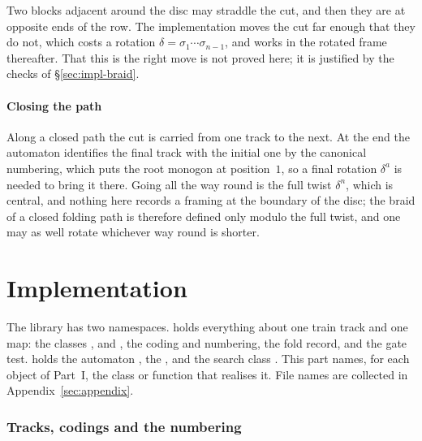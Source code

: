 \documentclass[12pt]{amsart}
\newcommand{\np}{n}                       %
\theoremstyle{plain}
\theoremstyle{definition}
\begin{document}
Two blocks adjacent around the disc may straddle the cut, and then they
are at opposite ends of the row.  The implementation moves the cut far
enough that they do not, which costs a rotation
$\delta = \sigma_1 \cdots \sigma_{\np-1}$, and works in the rotated frame
thereafter.  That this is the right move is not proved here; it is
justified by the checks of \S\ref{sec:impl-braid}.

\subsection{Closing the path}
Along a closed path the cut is carried from one track to the next.  At the
end the automaton identifies the final track with the initial one by the
canonical numbering, which puts the root monogon at position~$1$, so a
final rotation $\delta^a$ is needed to bring it there.  Going all the way
round is the full twist $\delta^{\np}$, which is central, and nothing here
records a framing at the boundary of the disc; the braid of a closed folding
path is therefore defined only modulo the full twist, and one may as well
rotate whichever way round is shorter.

\part{Implementation}

The library has two namespaces.   holds everything
about one train track and one map: the classes ,
 and , the coding and numbering, the fold
record, and the gate test.   holds the automaton
, the , and the search class
.  This part names, for each object of Part~I, the class or
function that realises it.  File names are collected in
Appendix~\ref{sec:appendix}.

\section{Tracks, codings and the numbering}
\label{sec:impl-tracks}
\end{document}
